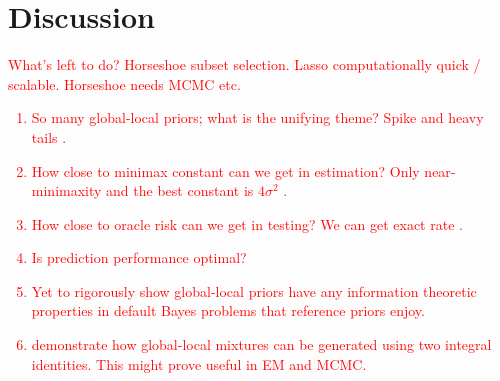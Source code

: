 \documentclass[11pt]{article}
\numberwithin{equation}{section}
\begin{document}


\section{Discussion}

\textcolor{red}{
What's left to do? Horseshoe subset selection. Lasso computationally quick / scalable. Horseshoe needs MCMC etc. 
\begin{enumerate}
\item So many global-local priors; what is the unifying theme? Spike and heavy tails \citet{polson2010shrink,van2015conditions}.
\item How close to minimax constant can we get in estimation? Only near-minimaxity and the best constant is $4\sigma^2$ \citep{van2017adaptive}.
\item How close to oracle risk can we get in testing? We can get exact rate \citep{ghosh2016testing}.
\item Is prediction performance optimal? 
\item Yet to rigorously show global-local priors have any information theoretic properties in default Bayes problems that reference priors \citep{bernardo1979reference} enjoy.
\item \citet{bhadra2016global} demonstrate how global-local mixtures can be generated using two integral identities. This might prove useful in EM and MCMC.
\end{enumerate}
}
\end{document}
